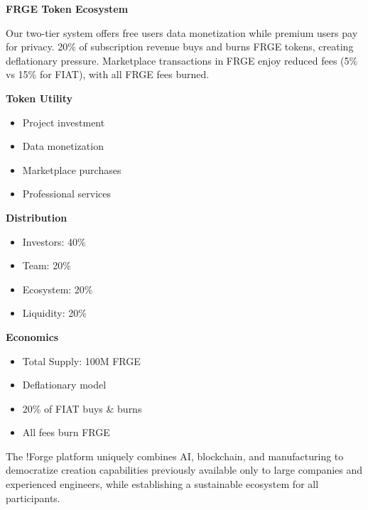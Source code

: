 \vspace{0.2cm}
\begin{center}
\begin{minipage}{0.95\textwidth}
\textcolor{fabSecondary}{\textbf{FRGE Token Ecosystem}}
\end{minipage}
\end{center}

\vspace{0.05cm}
\noindent Our two-tier system offers free users data monetization while premium users pay for privacy. 20\% of subscription revenue buys and burns FRGE tokens, creating deflationary pressure. Marketplace transactions in FRGE enjoy reduced fees (5\% vs 15\% for FIAT), with all FRGE fees burned.

\vspace{0.2cm}
\begin{multicols}{3}
\textcolor{fabPrimary}{\textbf{Token Utility}}
\begin{itemize}[leftmargin=*, topsep=0pt, itemsep=0pt]
    \item Project investment
    \item Data monetization
    \item Marketplace purchases
    \item Professional services
\end{itemize}

\columnbreak

\textcolor{fabSecondary}{\textbf{Distribution}}
\begin{itemize}[leftmargin=*, topsep=0pt, itemsep=0pt]
    \item Investors: 40\%
    \item Team: 20\%
    \item Ecosystem: 20\%
    \item Liquidity: 20\%
\end{itemize}

\columnbreak

\textcolor{fabAccent}{\textbf{Economics}}
\begin{itemize}[leftmargin=*, topsep=0pt, itemsep=0pt]
    \item Total Supply: 100M FRGE
    \item Deflationary model
    \item 20\% of FIAT buys \& burns
    \item All fees burn FRGE
\end{itemize}
\end{multicols}

\vspace{0.2cm}
\noindent The !Forge platform uniquely combines AI, blockchain, and manufacturing to democratize creation capabilities previously available only to large companies and experienced engineers, while establishing a sustainable ecosystem for all participants. 